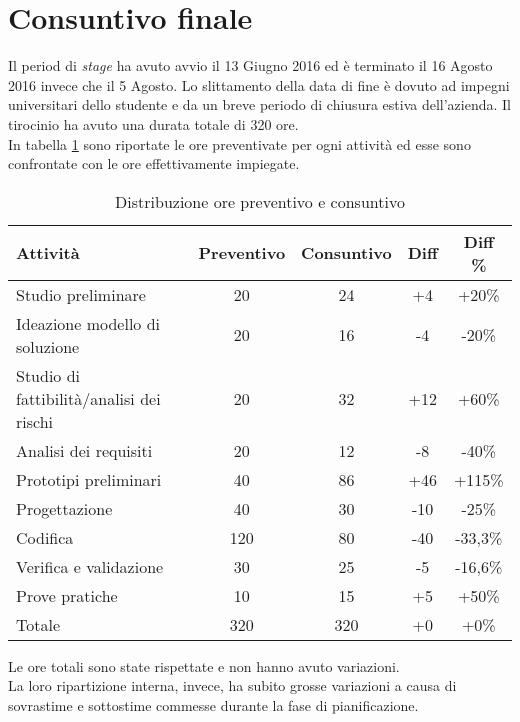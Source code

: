 \section{Consuntivo finale}
Il period di \emph{stage} ha avuto avvio il 13 Giugno 2016 ed è terminato il 16 Agosto 2016 invece che il 5 Agosto. Lo slittamento della data di fine è dovuto ad impegni universitari dello studente e da un breve periodo di chiusura estiva dell'azienda. Il tirocinio ha avuto una durata totale di 320 ore.\\
In tabella \ref{tab:preventivo-consuntivo} sono riportate le ore preventivate per ogni attività ed esse sono confrontate con le ore effettivamente impiegate.
\begin{table}[H]
	\begin{center}
	  \begin{tabular}{| l | c | c | c | c |}
	    \hline
	    \textbf{Attività} & \textbf{Preventivo} & \textbf{Consuntivo} & \textbf{Diff} & \textbf{Diff \%} \\ \hline
	    Studio preliminare & 20 & 24 & +4 & +20\%\\
	    \hline
	    Ideazione modello di soluzione & 20 & 16 & -4 & -20\%\\
	    \hline
	    Studio di fattibilità/analisi dei rischi & 20 & 32 & +12 & +60\%\\
	    \hline
	    Analisi dei requisiti & 20 & 12 & -8 & -40\%\\
	    \hline
	    Prototipi preliminari & 40 & 86 & +46 & +115\%\\
	    \hline
	    Progettazione & 40 & 30 & -10 & -25\%\\
	    \hline
	    Codifica & 120 & 80 & -40 & -33,3\%\\
	    \hline
	    Verifica e validazione & 30 & 25 & -5 & -16,6\%\\
	    \hline
	    Prove pratiche & 10 & 15 & +5 & +50\%\\
	    \hline
	    Totale & 320 & 320 & +0 & +0\%\\
	    \hline
	  \end{tabular}
	\end{center}
	\caption{Distribuzione ore preventivo e consuntivo}\label{tab:preventivo-consuntivo}
\end{table}
Le ore totali sono state rispettate e non hanno avuto variazioni.\\
La loro ripartizione interna, invece, ha subito grosse variazioni a causa di sovrastime e sottostime commesse durante la fase di pianificazione.\\

